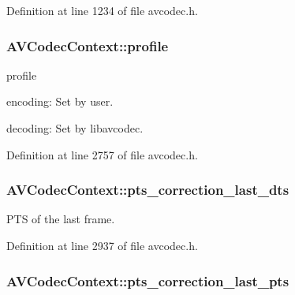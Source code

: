 Definition at line 1234 of file avcodec.\+h.

\subsubsection[{\texorpdfstring{profile}{profile}}]{ A\+V\+Codec\+Context\+::profile}\hypertarget{struct_a_v_codec_context_a7abe7095de73df98df4895bf9e25fc6b}{}\label{struct_a_v_codec_context_a7abe7095de73df98df4895bf9e25fc6b}
profile
\begin{DoxyItemize}
\item encoding\+: Set by user.
\item decoding\+: Set by libavcodec. 
\end{DoxyItemize}

Definition at line 2757 of file avcodec.\+h.

\subsubsection[{\texorpdfstring{pts\+\_\+correction\+\_\+last\+\_\+dts}{pts_correction_last_dts}}]{ A\+V\+Codec\+Context\+::pts\+\_\+correction\+\_\+last\+\_\+dts}\hypertarget{struct_a_v_codec_context_a0851bd5a557ed7f8377c491fda568508}{}\label{struct_a_v_codec_context_a0851bd5a557ed7f8377c491fda568508}


P\+TS of the last frame. 



Definition at line 2937 of file avcodec.\+h.

\subsubsection[{\texorpdfstring{pts\+\_\+correction\+\_\+last\+\_\+pts}{pts_correction_last_pts}}]{ A\+V\+Codec\+Context\+::pts\+\_\+correction\+\_\+last\+\_\+pts}\hypertarget{struct_a_v_codec_context_a16b6e9857d88041fa37a92b722b6c74a}{}\label{struct_a_v_codec_context_a16b6e9857d88041fa37a92b722b6c74a}


